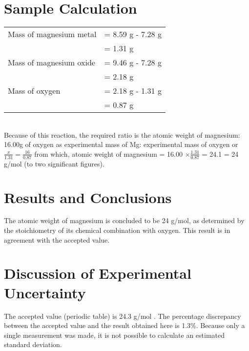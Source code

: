 \documentclass{article}
\begin{document}

\section{Sample Calculation}

\begin{tabular}{ll}
Mass of magnesium metal & = 8.59 g - 7.28 g\\
& = 1.31 g\\
Mass of magnesium oxide & = 9.46 g - 7.28 g\\
& = 2.18 g\\
Mass of oxygen & = 2.18 g - 1.31 g\\
& = 0.87 g
\end{tabular}\\
Because of this reaction, the required ratio is the atomic weight of magnesium: 16.00g of oxygen as experimental mass of Mg: experimental mass of oxygen or $\frac{x}{1.31}=\frac{16}{0.87}$ from which, atomic weight of magnesium = 16.00 $\times \frac{1.31}{0.87}$ = 24.1 = 24 g/mol (to two significant figures).


\section{Results and Conclusions}

The atomic weight of magnesium is concluded to be 24 g/mol, as determined by the stoichiometry of its chemical combination with oxygen. This result is in agreement with the accepted value.


\section{Discussion of Experimental Uncertainty}

The accepted value (periodic table) is 24.3 g/mol \cite{Smith:2012qr}. The percentage discrepancy between the accepted value and the result obtained here is 1.3\%. Because only a single measurement was made, it is not possible to calculate an estimated standard deviation. \\
\end{document}
